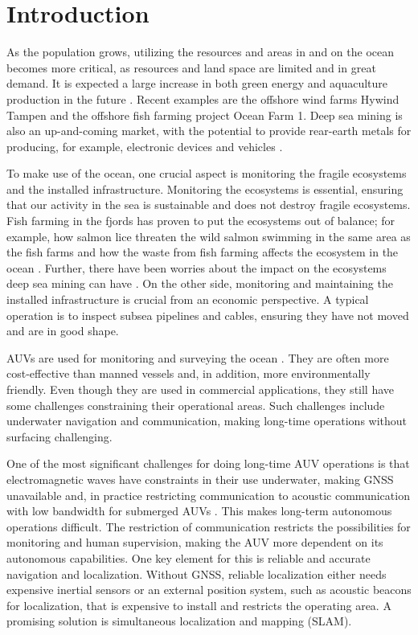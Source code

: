 \chapter{Introduction}

As the population grows, utilizing the resources and areas in and on the ocean becomes more critical, as resources and land space are limited and in great demand. It is expected a large increase in both green energy and aquaculture production in the future \cite{Oceans2050}. Recent examples are the offshore wind farms Hywind Tampen \cite{HywindEquinor} and the offshore fish farming project Ocean Farm 1\cite{HavbasertASA}. Deep sea mining is also an up-and-coming market, with the potential to provide rear-earth metals for producing, for example, electronic devices and vehicles \cite{Bogue2015UnderwaterApplications}.

To make use of the ocean, one crucial aspect is monitoring the fragile ecosystems and the installed infrastructure. Monitoring the ecosystems is essential, ensuring that our activity in the sea is sustainable and does not destroy fragile ecosystems. Fish farming in the fjords has proven to put the ecosystems out of balance; for example, how salmon lice threaten the wild salmon swimming in the same area as the fish farms and how the waste from fish farming affects the ecosystem in the ocean \cite{Fiskeoppdrett}. Further, there have been worries about the impact on the ecosystems deep sea mining can have \cite{UnderstandingTechnology}. On the other side, monitoring and maintaining the installed infrastructure is crucial from an economic perspective. A typical operation is to inspect subsea pipelines and cables, ensuring they have not moved and are in good shape. 

AUVs are used for monitoring and surveying the ocean \cite{Nicholson2008TheTechnologies, HaugstadDenManeder}   . They are often more cost-effective than manned vessels and, in addition, more environmentally friendly. Even though they are used in commercial applications, they still have some challenges constraining their operational areas. Such challenges include underwater navigation and communication, making long-time operations without surfacing challenging. 

One of the most significant challenges for doing long-time AUV operations is that electromagnetic waves have constraints in their use underwater, making GNSS unavailable and, in practice restricting communication to acoustic communication with low bandwidth for submerged AUVs \cite{Nicholson2008TheTechnologies}. This makes long-term autonomous operations difficult. The restriction of communication restricts the possibilities for monitoring and human supervision, making the AUV more dependent on its autonomous capabilities. One key element for this is reliable and accurate navigation and localization. Without GNSS, reliable localization either needs expensive inertial sensors or an external position system, such as acoustic beacons for localization, that is expensive to install and restricts the operating area. A promising solution is simultaneous localization and mapping (SLAM).

